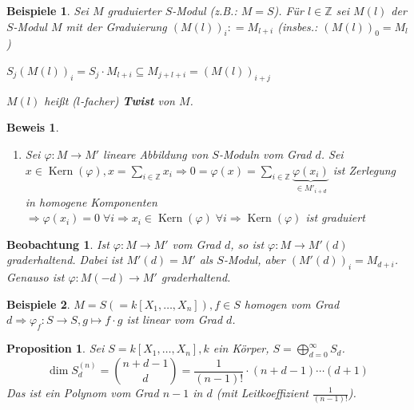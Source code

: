\documentclass[a4paper,12pt]{scrbook}
\theoremstyle{break}
\newtheorem{Prop}[Def]{Proposition}
\theoremstyle{nonumberbreak}
\newtheorem{Bew}{Beweis}
\newtheorem{nnBsp}{Beispiele}
\newtheorem{Beo}{Beobachtung}
\theoremstyle{nonumberplain}
\newcommand{\emp}[1]{\textbf{\emph{#1}}}
\newcommand{\defeqr}[0]{\mathrel{\mathop:}=}
\DeclareMathOperator{\Kern}{Kern}
\begin{document}
\begin{nnBsp}
Sei $M$ graduierter $S$-Modul (z.B.: $M=S$). Für $l \in \mathbb{Z}$ sei
$M(l)$ der $S$-Modul $M$ mit der Graduierung $(M(l))_i\defeqr M_{l+i}$
(insbes.: $(M(l))_0 = M_l$)

$S_j(M(l))_i=S_j\cdot M_{l+i}\subseteq M_{j+l+i}=(M(l))_{i+j}$

$M(l)$ heißt ($l$-facher) \emp{Twist} von $M$.
\end{nnBsp}

\begin{Bew}
  \begin{enumerate}
    \item[(e)] Sei $\varphi: M \to M'$ lineare Abbildung von $S$-Moduln vom Grad
    $d$. Sei $x \in \Kern(\varphi), x = \sum_{i \in \mathbb{Z}} x_i
    \Rightarrow 0 = \varphi(x) = \sum_{i \in \mathbb{Z}} \underset{\in M'_{i +
    d}}{\underbrace{\varphi(x_i)}}$ ist Zerlegung in homogene Komponenten
    $\Rightarrow \varphi(x_i) = 0 \; \forall i \Rightarrow x_i \in \Kern(\varphi) \; \forall i \Rightarrow \Kern(\varphi)$ ist graduiert
  \end{enumerate}
\end{Bew}

\begin{Beo}
  Ist $\varphi: M \to M'$ vom Grad $d$, so ist $\varphi: M \to M'(d)$
  graderhaltend. Dabei ist $M'(d) = M'$ als $S$-Modul, aber $(M'(d))_i = M_{d
  +i}$. Genauso ist $\varphi: M(-d) \to M'$ graderhaltend.
\end{Beo}

\begin{nnBsp}
  $M = S (=k[X_1, \dots, X_n]), f \in S$ homogen vom Grad $d \Rightarrow
  \varphi_f: S \to S, g \mapsto f \cdot g$ ist linear vom Grad $d$.
\end{nnBsp}

\begin{Prop}
  Sei $S = k[X_1, \dots, X_n], k$ ein Körper, $S = \bigoplus_{d = 0}^{\infty} S_d$.
  $$\dim S_d^{(n)} = {n+d-1 \choose d} = \frac{1}{(n-1)!} \cdot (n+d-1) \cdots (d+1)$$
  Das ist ein Polynom vom Grad $n-1$ in $d$ (mit Leitkoeffizient $\frac{1}{(n-1)!}$).
\end{Prop}
\end{document}
